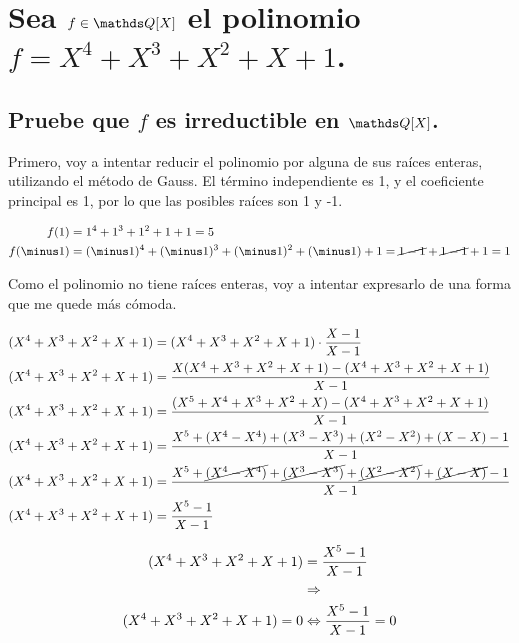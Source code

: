 \documentclass[a4paper,spanish]{article}
\begin{document}
\newpage
\section{%
Sea $f \in \Q[X]$ el polinomio $f = X^4 + X^3 + X^2 + X + 1$.%
}
  \subsection{%
    Pruebe que $f$ es irreductible en $\Q[X]$.%
  }

  Primero, voy a intentar reducir el polinomio por alguna de sus raíces
  enteras, utilizando el método de Gauss. El término independiente es 1, y el
  coeficiente principal es 1, por lo que las posibles raíces son 1 y -1.

  \begin{align*}
    f(1) &= 1^4 + 1^3 + 1^2 + 1 + 1 = 5 \\
    f(\minus1) &= (\minus1)^4 + (\minus1)^3 + (\minus1)^2 + (\minus1) + 1 %
      = \cancel{1 - 1} + \cancel{1 - 1} + 1 = 1
  \end{align*}

  Como el polinomio no tiene raíces enteras, voy a intentar expresarlo de una
  forma que me quede más cómoda.

  \begin{align*}
    (X^4+X^3+X^2+X+1)&=(X^4+X^3+X^2+X+1) \cdot \frac{X-1}{X-1} \\
    (X^4+X^3+X^2+X+1)&=\frac{X(X^4+X^3+X^2+X+1) - (X^4+X^3+X^2+X+1)}{X-1} \\
    (X^4+X^3+X^2+X+1)&=\frac{(X^5+X^4+X^3+X^2+X) - (X^4+X^3+X^2+X+1)}{X-1} \\
    (X^4+X^3+X^2+X+1)&=\frac{X^5+(X^4-X^4)+(X^3-X^3)+(X^2-X^2)+(X-X)-1}{X-1} \\
    (X^4+X^3+X^2+X+1)&=\frac{X^5+\cancel{(X^4-X^4)}+\cancel{(X^3-X^3)}+%
      \cancel{(X^2-X^2)}+\cancel{(X-X)}-1}{X-1} \\
    (X^4+X^3+X^2+X+1)&=\frac{X^5-1}{X-1} \\
  \end{align*}

  \begin{align*}
    (X^4+X^3+X^2+X+1)&=\frac{X^5-1}{X-1} \\
    &\Rightarrow \\
    (X^4+X^3+X^2+X+1)=0 &\Leftrightarrow \frac{X^5-1}{X-1}=0
  \end{align*}
\end{document}

